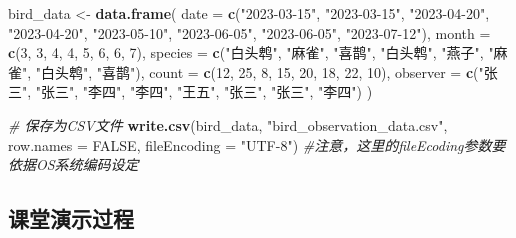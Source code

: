 \documentclass[
  twoside]{book}
\newenvironment{Shaded}{\begin{snugshade}}{\end{snugshade}}
\newcommand{\AttributeTok}[1]{\textcolor[rgb]{0.13,0.29,0.53}{#1}}
\newcommand{\CommentTok}[1]{\textcolor[rgb]{0.56,0.35,0.01}{\textit{#1}}}
\newcommand{\ConstantTok}[1]{\textcolor[rgb]{0.56,0.35,0.01}{#1}}
\newcommand{\DecValTok}[1]{\textcolor[rgb]{0.00,0.00,0.81}{#1}}
\newcommand{\FunctionTok}[1]{\textcolor[rgb]{0.13,0.29,0.53}{\textbf{#1}}}
\newcommand{\NormalTok}[1]{#1}
\newcommand{\OtherTok}[1]{\textcolor[rgb]{0.56,0.35,0.01}{#1}}
\newcommand{\StringTok}[1]{\textcolor[rgb]{0.31,0.60,0.02}{#1}}
\begin{document}
\begin{Shaded}
\begin{Highlighting}[]
\NormalTok{bird\_data }\OtherTok{\textless{}{-}} \FunctionTok{data.frame}\NormalTok{(}
    \AttributeTok{date =} \FunctionTok{c}\NormalTok{(}\StringTok{"2023{-}03{-}15"}\NormalTok{, }\StringTok{"2023{-}03{-}15"}\NormalTok{, }\StringTok{"2023{-}04{-}20"}\NormalTok{,}
  \StringTok{"2023{-}04{-}20"}\NormalTok{,}
             \StringTok{"2023{-}05{-}10"}\NormalTok{, }\StringTok{"2023{-}06{-}05"}\NormalTok{, }\StringTok{"2023{-}06{-}05"}\NormalTok{,}
  \StringTok{"2023{-}07{-}12"}\NormalTok{),}
    \AttributeTok{month =} \FunctionTok{c}\NormalTok{(}\DecValTok{3}\NormalTok{, }\DecValTok{3}\NormalTok{, }\DecValTok{4}\NormalTok{, }\DecValTok{4}\NormalTok{, }\DecValTok{5}\NormalTok{, }\DecValTok{6}\NormalTok{, }\DecValTok{6}\NormalTok{, }\DecValTok{7}\NormalTok{),}
    \AttributeTok{species =} \FunctionTok{c}\NormalTok{(}\StringTok{"白头鹎"}\NormalTok{, }\StringTok{"麻雀"}\NormalTok{, }\StringTok{"喜鹊"}\NormalTok{, }\StringTok{"白头鹎"}\NormalTok{, }\StringTok{"燕子"}\NormalTok{,}
  \StringTok{"麻雀"}\NormalTok{, }\StringTok{"白头鹎"}\NormalTok{, }\StringTok{"喜鹊"}\NormalTok{),}
    \AttributeTok{count =} \FunctionTok{c}\NormalTok{(}\DecValTok{12}\NormalTok{, }\DecValTok{25}\NormalTok{, }\DecValTok{8}\NormalTok{, }\DecValTok{15}\NormalTok{, }\DecValTok{20}\NormalTok{, }\DecValTok{18}\NormalTok{, }\DecValTok{22}\NormalTok{, }\DecValTok{10}\NormalTok{),}
    \AttributeTok{observer =} \FunctionTok{c}\NormalTok{(}\StringTok{"张三"}\NormalTok{, }\StringTok{"张三"}\NormalTok{, }\StringTok{"李四"}\NormalTok{, }\StringTok{"李四"}\NormalTok{, }\StringTok{"王五"}\NormalTok{, }\StringTok{"张三"}\NormalTok{,}
  \StringTok{"张三"}\NormalTok{, }\StringTok{"李四"}\NormalTok{)}
\NormalTok{  )}

\CommentTok{\# 保存为CSV文件}
\FunctionTok{write.csv}\NormalTok{(bird\_data, }\StringTok{"bird\_observation\_data.csv"}\NormalTok{, }\AttributeTok{row.names =}
  \ConstantTok{FALSE}\NormalTok{, }\AttributeTok{fileEncoding =} \StringTok{"UTF{-}8"}\NormalTok{)}
\CommentTok{\#注意，这里的fileEcoding参数要依据OS系统编码设定}
\end{Highlighting}
\end{Shaded}

\hypertarget{ux8bfeux5802ux6f14ux793aux8fc7ux7a0b-4}{%
\subsection{课堂演示过程}\label{ux8bfeux5802ux6f14ux793aux8fc7ux7a0b-4}}
\end{document}
